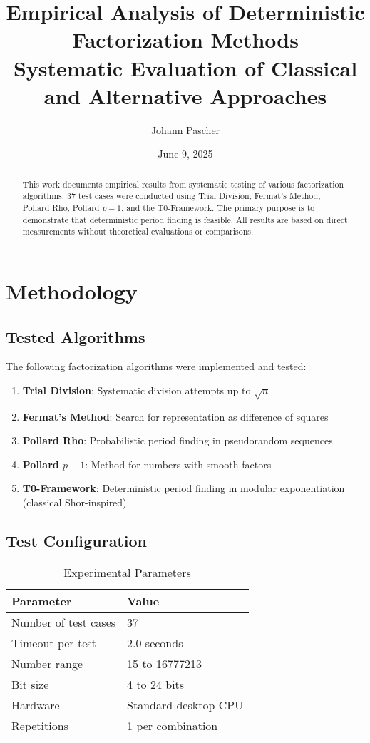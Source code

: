 \documentclass[12pt,a4paper]{article}
\title{Empirical Analysis of Deterministic Factorization Methods \\
	\large Systematic Evaluation of Classical and Alternative Approaches}
\author{Johann Pascher}
\date{June 9, 2025}
\begin{document}
	
	\maketitle
	
	\begin{abstract}
		This work documents empirical results from systematic testing of various factorization algorithms. 37 test cases were conducted using Trial Division, Fermat's Method, Pollard Rho, Pollard $p-1$, and the T0-Framework. The primary purpose is to demonstrate that deterministic period finding is feasible. All results are based on direct measurements without theoretical evaluations or comparisons.
	\end{abstract}
	
	\tableofcontents
	\newpage
	
	\section{Methodology}
	
	\subsection{Tested Algorithms}
	
	The following factorization algorithms were implemented and tested:
	
	\begin{enumerate}
		\item \textbf{Trial Division}: Systematic division attempts up to $\sqrt{n}$
		\item \textbf{Fermat's Method}: Search for representation as difference of squares
		\item \textbf{Pollard Rho}: Probabilistic period finding in pseudorandom sequences
		\item \textbf{Pollard $p-1$}: Method for numbers with smooth factors
		\item \textbf{T0-Framework}: Deterministic period finding in modular exponentiation (classical Shor-inspired)
	\end{enumerate}
	
	\subsection{Test Configuration}
	
	\begin{table}[H]
		\centering
		\caption{Experimental Parameters}
		\begin{tabular}{ll}
			\toprule
			\textbf{Parameter} & \textbf{Value} \\
			\midrule
			Number of test cases & 37 \\
			Timeout per test & 2.0 seconds \\
			Number range & 15 to 16777213 \\
			Bit size & 4 to 24 bits \\
			Hardware & Standard desktop CPU \\
			Repetitions & 1 per combination \\
			\bottomrule
		\end{tabular}
		\label{tab:test_config}
	\end{table}
	
\end{document}
